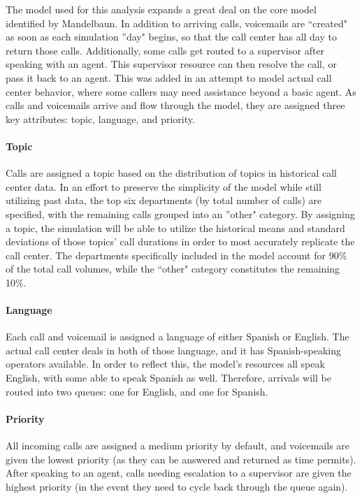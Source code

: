 \documentclass[12pt,twocolumn]{article}
\begin{document}
The model used for this analysis expands a great deal on the core model identified by Mandelbaun.  In addition to arriving calls, voicemails are ``created" as soon as each simulation ''day" begins, so that the call center has all day to return those calls.  Additionally, some calls get routed to a supervisor after speaking with an agent.  This supervisor resource can then resolve the call, or pass it back to an agent.  This was added in an attempt to model actual call center behavior, where some callers may need assistance beyond a basic agent.  As calls and voicemails arrive and flow through the model, they are assigned three key attributes: topic, language, and priority.


\paragraph{Topic}

Calls are assigned a topic based on the distribution of topics in historical call center data.  In an effort to preserve the simplicity of the model while still utilizing past data, the top six departments (by total number of calls) are specified, with the remaining calls grouped into an ''other" category.  By assigning a topic, the simulation will be able to utilize the historical means and standard deviations of those topics' call durations in order to most accurately replicate the call center.  The departments specifically included in the model account for 90\% of the total call volumes, while the ``other" category constitutes the remaining 10\%.


\paragraph{Language}

Each call and voicemail is assigned a language of either Spanish or English.  The actual call center deals in both of those language, and it has Spanish-speaking operators available.  In order to reflect this, the model's resources all speak English, with some able to speak Spanish as well.  Therefore, arrivals will be routed into two queues:  one for English, and one for Spanish.

\paragraph{Priority}

All incoming calls are assigned a medium priority by default, and voicemails are given the lowest priority (as they can be answered and returned as time permits).  After speaking to an agent, calls needing escalation to a supervisor are given the highest priority (in the event they need to cycle back through the queue again).
\end{document}

